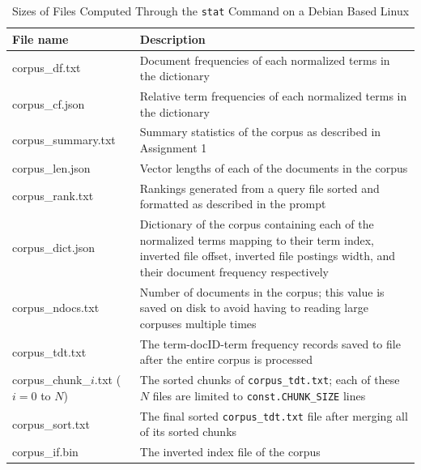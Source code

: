 \documentclass[11pt]{article}
\begin{document}
\begin{table}[h]
    \begin{center}
        
        \begin{tabular}{| L{3.5cm} | L{12cm} |}
        \hline
        \textbf{File name} & \textbf{Description}
        \\ \hline
        corpus\_df.txt & Document frequencies of each normalized terms in the dictionary
        \\ \hline
        corpus\_cf.json & Relative term frequencies of each normalized terms in the dictionary
        \\ \hline
        corpus\_summary.txt & Summary statistics of the corpus as described in Assignment 1
        \\ \hline
        corpus\_len.json & Vector lengths of each of the documents in the corpus
        \\ \hline
        corpus\_rank.txt & Rankings generated from a query file sorted and formatted as described in the prompt
        \\ \hline
        corpus\_dict.json & Dictionary of the corpus containing each of the normalized terms mapping to their term index, inverted file offset, inverted file postings width, and their document frequency respectively
        \\ \hline
        corpus\_ndocs.txt & Number of documents in the corpus; this value is saved on disk to avoid having to reading large corpuses multiple times
        \\ \hline
        corpus\_tdt.txt & The term-docID-term frequency records saved to file after the entire corpus is processed
        \\ \hline
        corpus\_chunk\_$i$.txt ($i=0$ to $N$) & The sorted chunks of \texttt{corpus\_tdt.txt}; each of these  $N$ files are limited to \texttt{const.CHUNK\_SIZE} lines
        \\ \hline
        corpus\_sort.txt & The final sorted \texttt{corpus\_tdt.txt} file after merging all of its sorted chunks
        \\ \hline
        corpus\_if.bin & The inverted index file of the corpus
        \\ \hline
        \end{tabular}

    \end{center}
    \caption{Sizes of Files Computed Through the \texttt{stat} Command on a Debian Based Linux}

\end{table}
\end{document}
